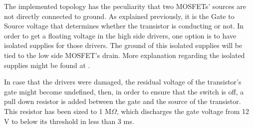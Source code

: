The implemented topology has the peculiarity that two MOSFETs' sources are not directly connected to ground. As explained previously, it is the Gate to Source voltage that determines whether the transistor is conducting or not. In order to get a floating voltage in the high side drivers, one option is to have isolated supplies for those drivers. The ground of this isolated supplies will be tied to the low side MOSFET's drain. More explanation regarding the isolated supplies might be found at .

In case that the drivers were damaged, the residual voltage of the transistor's gate might become undefined, then, in order to ensure that the switch is off, a pull down resistor is added between the gate and the source of the transistor. This resistor has been sized to 1 M$\Omega$, which discharges the gate voltage from 12 V to below its threshold in less than 3 ms.
